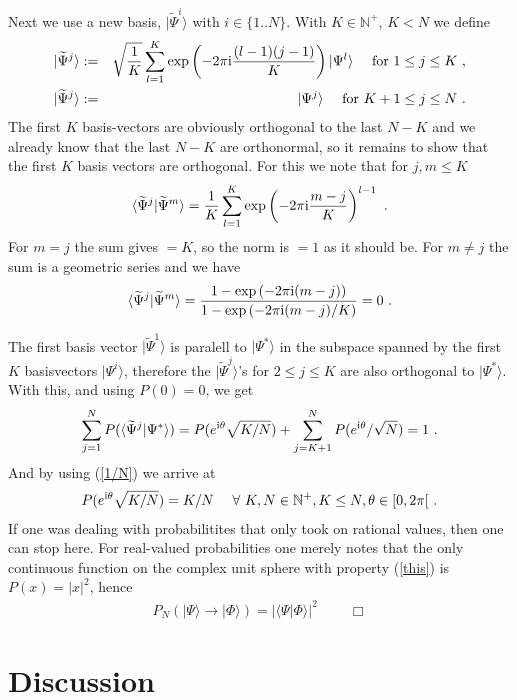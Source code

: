 \documentclass[11pt,twoside,A4]{article}
\def\beqn{\begin{eqnarray}}
\def\eeqn{\end{eqnarray}}
\begin{document}
Next we use a new basis, $|\widetilde \Psi^i \rangle$ with $i \in \{1..N \}$. With $K \in {\mathbb{N}}^+$, $K < N$ we define
\beqn
| \widetilde \Psi^j \rangle &:=& \sqrt{\frac{1}{K}} \sum_{l=1}^K \exp \left( -2 \pi {\rm i} \frac{(l-1) (j-1)}{K} \right) |\Psi^l \rangle  ~~~~{\mbox{for}}~1 \leq j \leq K~, \nonumber\\
| \widetilde \Psi^j \rangle &:=& |\Psi^j \rangle ~~~~{\mbox{for}}~K+1 \leq j \leq N~. \label{tildebasis}
\eeqn
The first $K$ basis-vectors are obviously orthogonal to the last $N-K$ and we already know that the last $N-K$ are orthonormal, so it remains to show that the first $K$ basis vectors are orthogonal. For this we note that for $j,m \leq K$
\beqn
\langle \widetilde \Psi^j | \widetilde \Psi^m \rangle 
= \frac{1}{K} \sum_{l=1}^ K        
\exp \left( -2 \pi {\rm i} \frac{m-j}{K} \right)^{l-1} ~.
\eeqn
For $m=j$ the sum gives $=K$, so the norm is $=1$ as it should be. For $m \neq j$ the sum is a geometric series and we have
\beqn
\langle \widetilde \Psi^j | \widetilde \Psi^m \rangle = \frac{ 1- \exp \left( -2 \pi {\rm i} (m-j)\right)} {1- \exp \left( -2 \pi {\rm i} (m-j) /K \right)  } =0 ~.
\eeqn

The first basis vector $|\widetilde \Psi^1 \rangle$ is paralell to $|\Psi^* \rangle$ in the subspace spanned by the first $K$ basisvectors $|\Psi^i \rangle$, therefore the $|\widetilde \Psi^j \rangle$'s for $2\leq j \leq K$ are also orthogonal to $|\Psi^*\rangle$. With this, and using $P(0) = 0$, we get
\beqn
\sum_{j=1}^N P (\langle \widetilde \Psi^j | \Psi^* \rangle) = P( e^{{\rm i} \theta}  \sqrt{K/N} ) + \sum_{j=K+1}^N P (  e^{{\rm i} \theta}  /\sqrt{N}) = 1~.
\eeqn
And by using (\ref{1/N}) we arrive at
\beqn
P ( e^{{\rm i} \theta} \sqrt{K/N} ) = K/N ~~~~\forall~ K,N \in {\mathbb{N^+}}, K \leq N, \theta \in [0, 2 \pi [~. \label{this}
\eeqn
If one was dealing with probabilitites that only took on rational values, then one can stop here. For real-valued probabilities one merely notes that
the only continuous function on the complex unit sphere with property (\ref{this}) is $P(x) = |x|^2$, hence
\beqn
P_N ( |\Psi \rangle \to |\Phi \rangle) = |\langle \Psi | \Phi \rangle|^2 ~~~~~~~~~~ \Box
\eeqn


\section{Discussion}
\end{document}
